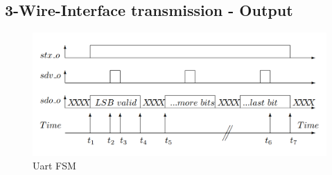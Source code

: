 \documentclass[12pt,a4 paper] {report}
\begin{document}
\subsection*{3-Wire-Interface transmission - Output}
\begin{figure}[h]
	\centering	
	\includegraphics[scale=0.4]{../png/3wireinterface.png}
	\caption{Uart FSM}
\end{figure}

\newpage
\end{document}
